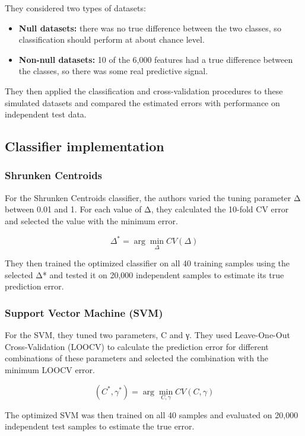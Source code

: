 \documentclass[
  letterpaper,
  DIV=11,
  numbers=noendperiod]{scrreprt}
\providecommand{\tightlist}{%
  \setlength{\itemsep}{0pt}\setlength{\parskip}{0pt}}
\begin{document}
They considered two types of datasets:

\begin{itemize}
\tightlist
\item
  \textbf{Null datasets:} there was no true difference between the two
  classes, so classification should perform at about chance level.
\item
  \textbf{Non-null datasets:} 10 of the 6,000 features had a true
  difference between the classes, so there was some real predictive
  signal.
\end{itemize}

They then applied the classification and cross-validation procedures to
these simulated datasets and compared the estimated errors with
performance on independent test data.

\subsection{Classifier implementation}\label{classifier-implementation}

\subsubsection{Shrunken Centroids}\label{shrunken-centroids}

For the Shrunken Centroids classifier, the authors varied the tuning
parameter Δ between 0.01 and 1. For each value of Δ, they calculated the
10-fold CV error and selected the value with the minimum error.

\[
\Delta^* = \arg\min_{\Delta} CV(\Delta)
\]

They then trained the optimized classifier on all 40 training samples
using the selected Δ* and tested it on 20,000 independent samples to
estimate its true prediction error.

\subsubsection{Support Vector Machine
(SVM)}\label{support-vector-machine-svm}

For the SVM, they tuned two parameters, C and γ. They used Leave-One-Out
Cross-Validation (LOOCV) to calculate the prediction error for different
combinations of these parameters and selected the combination with the
minimum LOOCV error.

\[
(C^*, \gamma^*) = \arg\min_{C,\gamma} CV(C,\gamma)
\]

The optimized SVM was then trained on all 40 samples and evaluated on
20,000 independent test samples to estimate the true error.
\end{document}
